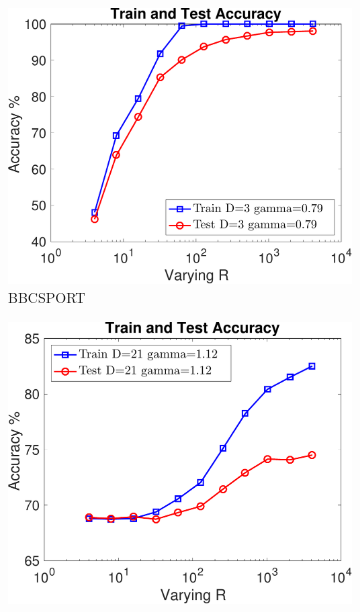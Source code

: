\documentclass[11pt,a4paper]{article}
\newcommand{\1}{\boldsymbol{1}}
\begin{document}
\begin{figure}[htb]
\centering
		\begin{subfigure}[b]{0.23\textwidth}
      \includegraphics[width=\textwidth]{Graphs/wmdk_varyingR/bbcsport_random_VaryingR_allSplits_CV_R512-eps-converted-to.pdf}
      \caption{BBCSPORT}
      \label{App:fig:exptsA_varyingR_bbcsport}
     	\end{subfigure}
		\begin{subfigure}[b]{0.23\textwidth}
      \includegraphics[width=\textwidth]{Graphs/wmdk_varyingR/twitter_random_VaryingR_allSplits_CV_R512-eps-converted-to.pdf}

\end{subfigure}
\end{figure}
\end{document}
